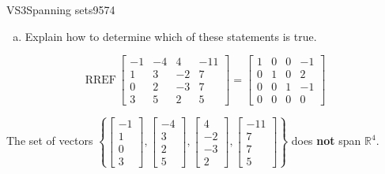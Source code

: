 \begin{exercise}{VS3}{Spanning sets}{9574}
\begin{exerciseStatement}
\begin{enumerate}[(a)]
\begin{itemize}
 
\end{itemize}

     
\item  

 Explain how to determine which of these statements is true. 

 
\end{enumerate}

     \end{exerciseStatement}
 \begin{exerciseAnswer} 

 \[
\mathrm{RREF}\, \left[\begin{array}{cccc}
-1 & -4 & 4 & -11 \\
1 & 3 & -2 & 7 \\
0 & 2 & -3 & 7 \\
3 & 5 & 2 & 5
\end{array}\right] = \left[\begin{array}{cccc}
1 & 0 & 0 & -1 \\
0 & 1 & 0 & 2 \\
0 & 0 & 1 & -1 \\
0 & 0 & 0 & 0
\end{array}\right]
            \] 

 

 The set of vectors \(\left\{ \left[\begin{array}{c}
-1 \\
1 \\
0 \\
3
\end{array}\right] , \left[\begin{array}{c}
-4 \\
3 \\
2 \\
5
\end{array}\right] , \left[\begin{array}{c}
4 \\
-2 \\
-3 \\
2
\end{array}\right] , \left[\begin{array}{c}
-11 \\
7 \\
7 \\
5
\end{array}\right] \right\}\) does \textbf{not} span \(\mathbb{R}^4\). 

 \end{exerciseAnswer}
 \end{exercise}


